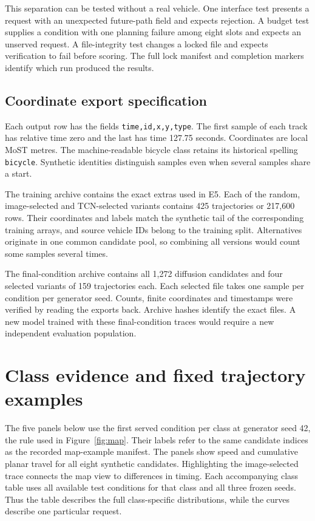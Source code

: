 This separation can be tested without a real vehicle. One interface test presents a request with an unexpected future-path field and expects rejection. A budget test supplies a condition with one planning failure among eight slots and expects an unserved request. A file-integrity test changes a locked file and expects verification to fail before scoring. The full lock manifest and completion markers identify which run produced the results.

\section{Coordinate export specification}
Each output row has the fields \texttt{time,id,x,y,type}. The first sample of each track has relative time zero and the last has time 127.75 seconds. Coordinates are local MoST metres. The machine-readable bicycle class retains its historical spelling \texttt{bicycle}. Synthetic identities distinguish samples even when several samples share a start.

The training archive contains the exact extras used in E5. Each of the random, image-selected and TCN-selected variants contains 425 trajectories or 217,600 rows. Their coordinates and labels match the synthetic tail of the corresponding training arrays, and source vehicle IDs belong to the training split. Alternatives originate in one common candidate pool, so combining all versions would count some samples several times.

The final-condition archive contains all 1,272 diffusion candidates and four selected variants of 159 trajectories each. Each selected file takes one sample per condition per generator seed. Counts, finite coordinates and timestamps were verified by reading the exports back. Archive hashes identify the exact files. A new model trained with these final-condition traces would require a new independent evaluation population.

\chapter{Class evidence and fixed trajectory examples}
\label{app:cases}
The five panels below use the first served condition per class at generator seed 42, the rule used in Figure~\ref{fig:map}. Their labels refer to the same candidate indices as the recorded map-example manifest. The panels show speed and cumulative planar travel for all eight synthetic candidates. Highlighting the image-selected trace connects the map view to differences in timing. Each accompanying class table uses all available test conditions for that class and all three frozen seeds. Thus the table describes the full class-specific distributions, while the curves describe one particular request.

